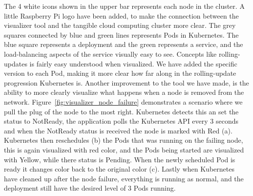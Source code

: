 \noindent The 4 white icons shown in the upper bar represents each node in the cluster. A little Raspberry Pi logo have been added, to make the connection between the visualizer tool and the tangible cloud computing cluster more clear. The grey squares connected by blue and green lines represents Pods in Kubernetes. The blue square represents a deployment and the green represents a service, and the load-balancing aspects of the service visually easy to see. Concepts like rolling-updates is fairly easy understood when visualized. We have added the specific version to each Pod, making it more clear how far along in the rolling-update progression Kubernetes is. Another improvement to the tool we have made, is the ability to more clearly visualize what happens when a node is removed from the network. Figure~\ref{fig:visualizer_node_failure} demonstrates a scenario where we pull the plug of the node to the most right. Kubernetes detects this an set the status to NotReady, the application polls the Kubernetes API every 3 seconds and when the NotReady status is received the node is marked with Red (a). Kubernetes then reschedules (b) the Pods that was running on the failing node, this is again visualized with red color, and the Pods being started are visualized with Yellow, while there status is Pending. When the newly scheduled Pod is ready it changes color back to the original color (c). Lastly when Kubernetes have cleaned up after the node failure, everything is running as normal, and the deployment still have the desired level of 3 Pods running.

